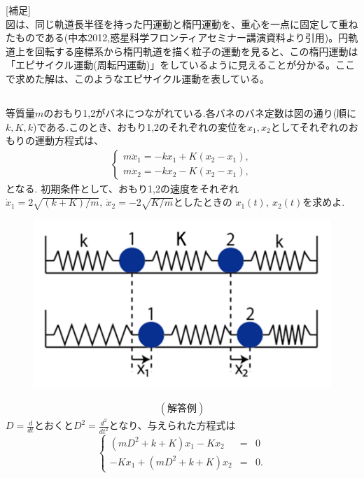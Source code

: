 \documentclass[a4paper,11pt,fleqn]{jarticle}
\begin{document}
[補足]\\
図は、同じ軌道長半径を持った円運動と楕円運動を、重心を一点に固定して重ねたものである(中本2012,惑星科学フロンティアセミナー講演資料より引用)。円軌道上を回転する座標系から楕円軌道を描く粒子の運動を見ると、この楕円運動は「エピサイクル運動(周転円運動)」をしているように見えることが分かる。ここで求めた解は、このようなエピサイクル運動を表している。

\newpage
\subsection{}
等質量$m$のおもり1,2がバネにつながれている.各バネのバネ定数は図の通り(順に$k,K,k$)である.このとき、おもり1,2のそれぞれの変位を$x_1,x_2$としてそれぞれのおもりの運動方程式は、
\begin{eqnarray*}
\left\{
\begin{array}{l}
m\ddot{x}_1 = -kx_1 + K(x_2-x_1), \\
m\ddot{x}_2 = -kx_2 - K(x_2-x_1),
\end{array}
\right.
\end{eqnarray*}
となる.
初期条件として、おもり1,2の速度をそれぞれ$\dot{x}_1 = 2\sqrt{(k + K)/m},\ \dot{x}_2 = -2\sqrt{K/m}$としたときの
$x_1(t),~x_2(t)$を求めよ.
\begin{figure}[htpb]
\begin{center}
\includegraphics[scale=.25]{bane2.png}
\end{center}
\end{figure}
\begin{eqnarray*}
(解答例)
\end{eqnarray*}
$D=\frac d{dt}$とおくと$D^2=\frac{d^2}{dt^2}$となり、与えられた方程式は
\[
\left\{
\begin{array}{rcl}
(mD^2+k+K)x_1 - Kx_2&=& 0 \\
-Kx_1 + (mD^2+k+K)x_2 &=& 0.
\end{array}
\right.
\]
\end{document}
